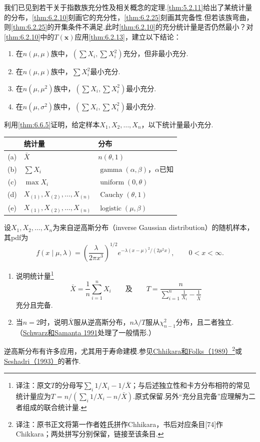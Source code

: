 \begin{exercise}\label{exercise:6.25}
我们已见到若干关于指数族充分性及相关概念的定理.\autoref{thm:5.2.11}给出了某统计量的分布，\autoref{thm:6.2.10}刻画它的充分性，\autoref{thm:6.2.25}刻画其完备性.但若该族弯曲，则\autoref{thm:6.2.25}的开集条件不满足.此时\autoref{thm:6.2.10}的充分统计量是否仍然最小？对\autoref{thm:6.2.10}中的$T(\boldsymbol x)$应用\autoref{thm:6.2.13}，建立以下结论：
\begin{enumerate}[label=(\alph*)]
\item 在$n(\mu,\mu)$族中，$(\sum X_i,\sum X_i^2)$充分，但非最小充分.
\item 在$n(\mu,\mu)$族中，$\sum X_i^2$最小充分.
\item 在$n(\mu,\mu^2)$族中，$(\sum X_i,\sum X_i^2)$最小充分.
\item 在$n(\mu,\sigma^2)$族中，$(\sum X_i,\sum X_i^2)$最小充分.
\end{enumerate}
\end{exercise}
\begin{exercise}\label{exercise:6.26}
利用\autoref{thm:6.6.5}证明，给定样本$X_1,X_2,\ldots,X_n$，以下统计量最小充分.
\begin{center}
\begin{tabular}{cll}
&统计量&分布\\\hline
(a)&$\bar X$&$n(\theta,1)$\\
(b)&$\sum X_i$&$\operatorname{gamma}(\alpha,\beta)$，$\alpha$已知\\
(c)&$\max X_i$&$\operatorname{uniform}(0,\theta)$\\
(d)&$X_{(1)},X_{(2)},\ldots,X_{(n)}$&$\operatorname{Cauchy}(\theta,1)$\\
(e)&$X_{(1)},X_{(2)},\ldots,X_{(n)}$&$\operatorname{logistic}(\mu,\beta)$
\end{tabular}
\end{center}
\end{exercise}
\begin{exercise}\label{exercise:6.27}
设$X_1,X_2,\ldots,X_n$为来自逆高斯分布（inverse Gaussian distribution）的随机样本，其pdf为
$$f(x\mid\mu,\lambda)=\left(\frac\lambda{2\pi x^3}\right)^{1/2}e^{-\lambda(x-\mu)^2/(2\mu^2x)},\qquad0<x<\infty.$$
\begin{enumerate}[label=(\alph*)]
\item 说明统计量\footnote{译注：原文$T$的分母写$\sum_i1/X_i-1/\bar X$；与后述独立性和卡方分布相符的常见统计量应为$T=n/(\sum_i1/X_i-n/\bar X)$.原式保留.另外“充分且完备”应理解为二者组成的联合统计量.}
$$\bar X=\frac1n\sum_{i=1}^nX_i\qquad\text{及}\qquad T=\frac n{\sum_{i=1}^n\frac1{X_i}-\frac1{\bar X}}$$
充分且完备.
\item 当$n=2$时，说明$\bar X$服从逆高斯分布，$n\lambda/T$服从$\chi_{n-1}^2$分布，且二者独立.（\hyperref[bib:source281]{Schwarz和Samanta 1991}处理了一般情形.）
\end{enumerate}
逆高斯分布有许多应用，尤其用于寿命建模.参见\hyperref[bib:source74]{Chhikara和Folks（1989）}\footnote{译注：原书正文将第一作者姓氏拼作Chhikara，书后对应条目[74]作Chikkara；两处拼写分别保留，链接至该条目.}或\hyperref[bib:source286]{Seshadri（1993）}的著作.
\end{exercise}
